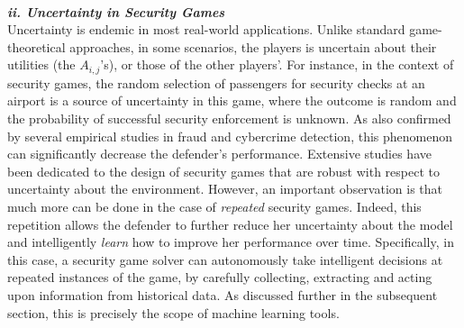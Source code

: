 
\noindent \textbf{\textit{\\ii. Uncertainty in Security Games}}\\
Uncertainty is endemic in most real-world applications. 
Unlike standard game-theoretical approaches, in some scenarios, the players is uncertain about their utilities (the $A_{i,j}$'s), or those of the other players'. For instance, in the context of security games, the random selection of passengers for security checks at an airport is a source of uncertainty in this game, where the outcome is random and the probability of successful security enforcement  is unknown. 
As also confirmed by several empirical studies in fraud and cybercrime detection, this phenomenon can significantly decrease the defender's performance\cite{granick2005faking, swire2009no}.
Extensive studies have been dedicated to the design of security games that are robust with respect to uncertainty about the environment\cite{aghassi2006robust,Nguyen14RO, Kiekintveld:2013}. 
However, an important observation is that much more can be done in the case of {\em repeated} security games.  
Indeed, this repetition allows the defender to further reduce her uncertainty about the model and intelligently {\em learn} how to improve her performance over time. Specifically, in this case, a security game solver can autonomously take intelligent decisions at repeated instances of the game, by carefully collecting, extracting and acting upon information from historical data. As discussed further in the subsequent section, this is precisely the scope of machine learning tools. 

